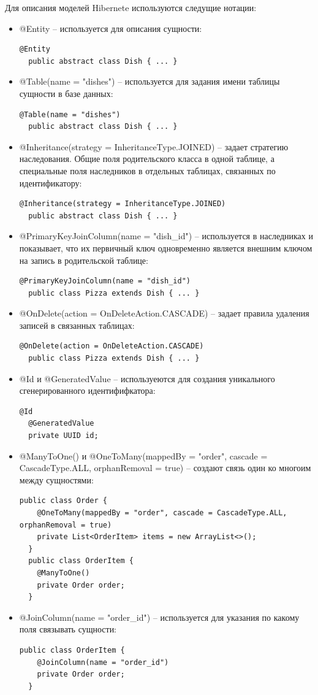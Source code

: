 \documentclass[a4paper,14pt]{extarticle}
\begin{document}
Для описания моделей Hibernete используются следущие нотации:
\begin{itemize}
  \item[--] @Entity -- используется для описания сущности:
  \begin{Verbatim}[tabsize=4]
  @Entity
  public abstract class Dish { ... }
  \end{Verbatim}
  \item[--] @Table(name = "dishes") -- используется для задания имени таблицы сущности в базе данных:
  \begin{Verbatim}[tabsize=4]
  @Table(name = "dishes")
  public abstract class Dish { ... }
  \end{Verbatim}
  \item[--] @Inheritance(strategy = InheritanceType.JOINED) -- задает стратегию наследования. Общие поля родительского класса в одной таблице, а специальные поля наследников в отдельных таблицах, связанных по идентификатору:
  \begin{Verbatim}[tabsize=4]
  @Inheritance(strategy = InheritanceType.JOINED)
  public abstract class Dish { ... }
  \end{Verbatim}
  \item[--] @PrimaryKeyJoinColumn(name = "dish\_id") -- используется в наследниках и показывает, что их первичный ключ одновременно является внешним ключом на запись в родительской таблице:
  \begin{Verbatim}[tabsize=4]
  @PrimaryKeyJoinColumn(name = "dish_id")
  public class Pizza extends Dish { ... }
  \end{Verbatim}
  \item[--] @OnDelete(action = OnDeleteAction.CASCADE) -- задает правила удаления записей в связанных таблицах:
  \begin{Verbatim}[tabsize=4]
  @OnDelete(action = OnDeleteAction.CASCADE)
  public class Pizza extends Dish { ... }
  \end{Verbatim}
  \item[--] @Id и @GeneratedValue -- используеются для создания уникального сгенерированного идентифифкатора:
  \begin{Verbatim}[tabsize=4]
  @Id
  @GeneratedValue
  private UUID id;
  \end{Verbatim}
  \item[--] @ManyToOne() и @OneToMany(mappedBy = "order", cascade = CascadeType.ALL, orphanRemoval = true) -- создают связь один ко многоим между сущностями:
  \begin{Verbatim}[tabsize=4]
  public class Order {
    @OneToMany(mappedBy = "order", cascade = CascadeType.ALL, orphanRemoval = true)
    private List<OrderItem> items = new ArrayList<>();
  }
  public class OrderItem {
    @ManyToOne()
    private Order order;
  }
  \end{Verbatim}
  \item[--] @JoinColumn(name = "order\_id") -- используется для указания по какому поля связывать сущности:
  \begin{Verbatim}[tabsize=4]
  public class OrderItem {
    @JoinColumn(name = "order_id")
    private Order order;
  }
  \end{Verbatim}
\end{itemize}
\end{document}
